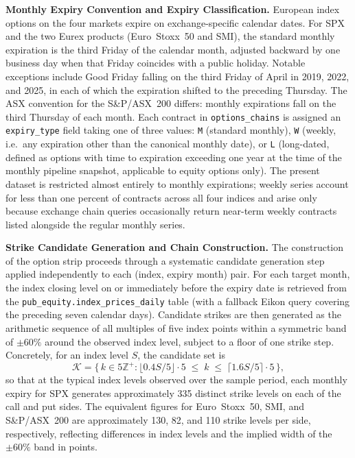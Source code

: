 \documentclass[12pt]{article}
\begin{document}
\bigskip

\noindent\textbf{Monthly Expiry Convention and Expiry Classification.}
European index options on the four markets expire on exchange-specific calendar
dates. For SPX and the two Eurex products (Euro~Stoxx~50 and SMI), the standard
monthly expiration is the third Friday of the calendar month, adjusted backward
by one business day when that Friday coincides with a public holiday. Notable
exceptions include Good Friday falling on the third Friday of April in 2019,
2022, and 2025, in each of which the expiration shifted to the preceding
Thursday. The ASX convention for the S\&P/ASX~200 differs: monthly expirations
fall on the third Thursday of each month. Each contract in \texttt{options\_chains}
is assigned an \texttt{expiry\_type} field taking one of three values: \texttt{M}
(standard monthly), \texttt{W} (weekly, i.e.\ any expiration other than the
canonical monthly date), or \texttt{L} (long-dated, defined as options with
time to expiration exceeding one year at the time of the monthly pipeline
snapshot, applicable to equity options only). The present dataset is
restricted almost entirely to monthly expirations; weekly series account for
less than one percent of contracts across all four indices and arise only
because exchange chain queries occasionally return near-term weekly contracts
listed alongside the regular monthly series.

\bigskip

\noindent\textbf{Strike Candidate Generation and Chain Construction.}
The construction of the option strip proceeds through a systematic candidate
generation step applied independently to each (index, expiry month) pair.
For each target month, the index closing level on or immediately before the
expiry date is retrieved from the \texttt{pub\_equity.index\_prices\_daily} table
(with a fallback Eikon query covering the preceding seven calendar days).
Candidate strikes are then generated as the arithmetic sequence of all
multiples of five index points within a symmetric band of $\pm60\%$ around the
observed index level, subject to a floor of one strike step. Concretely, for
an index level $S$, the candidate set is
\[
  \mathcal{K} = \bigl\{\, k \in 5\mathbb{Z}^+ \colon
  \lfloor 0.4S/5 \rfloor \cdot 5 \;\le\; k \;\le\;
  \lceil 1.6S/5 \rceil \cdot 5 \,\bigr\},
\]
so that at the typical index levels observed over the sample period, each
monthly expiry for SPX generates approximately 335 distinct strike levels on
each of the call and put sides. The equivalent figures for Euro~Stoxx~50, SMI,
and S\&P/ASX~200 are approximately 130, 82, and 110 strike levels per side,
respectively, reflecting differences in index levels and the implied width of
the $\pm60\%$ band in points.
\end{document}
